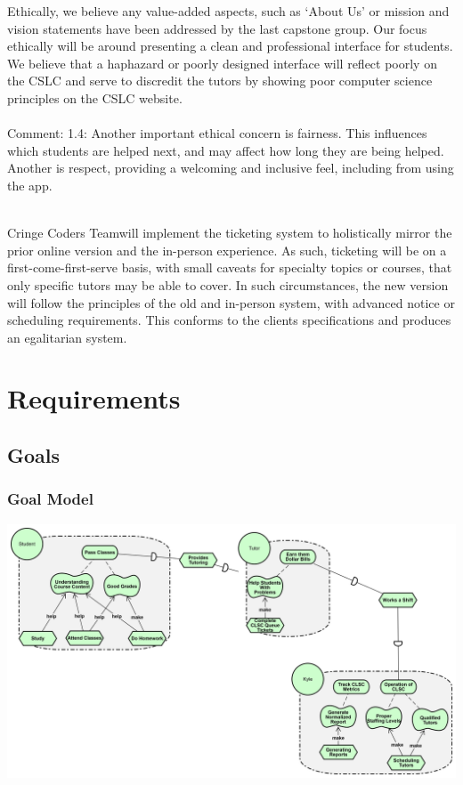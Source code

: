 \documentclass[oneside,openany,obeyspaces]{book}
\newcommand\tab[1][1cm]{\hspace*{#1}}
\newcommand\TeamName{Cringe Coders Team}
\begin{document}
\begin{flushleft}
    \tab Ethically, we believe any value-added aspects, such as ‘About Us' or mission and vision statements have been addressed by the last capstone group. Our focus ethically will be around presenting a clean and professional interface for students. We believe that a haphazard or poorly designed interface will reflect poorly on the CSLC and serve to discredit the tutors by showing poor computer science principles on the CSLC website.\\~\\

    {\color{red}Comment: 1.4: Another important ethical concern is fairness. This influences which students are helped next, and may affect how long they are being helped. Another is respect, providing a welcoming and inclusive feel, including from using the app.\\~\\}

    {\color{blue}\tab \TeamName will implement the ticketing system to holistically mirror the prior online version and the in-person experience. As such, ticketing will be on a first-come-first-serve basis, with small caveats for specialty topics or courses, that only specific tutors may be able to cover. In such circumstances, the new version will follow the principles of the old and in-person system, with advanced notice or scheduling requirements. This conforms to the clients specifications and produces an egalitarian system.}



    \chapter{Requirements}

    \section{Goals}

    \subsection{Goal Model}

    \includegraphics[width=160mm,scale=0.5]{img/goalDiagram.png}\\~\\


\end{flushleft}
\end{document}
